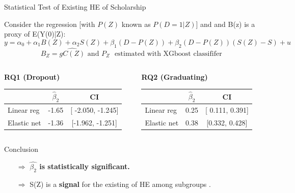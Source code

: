 \documentclass[aspectratio=169]{beamer}
\begin{document}
\begin{frame}{Statistical Test of Existing HE of Scholarship}

Consider the regression [with \( P(Z) \) known as \( P(D = 1 | Z) \)] and and B(z) is a proxy of E(Y(0)|Z):
\[
y = \alpha_0 + \alpha_1 B(Z) + \alpha_2 S(Z) + \beta_1 (D - P(Z)) + \beta_2 (D - P(Z))(S(Z) - S) + u
\]
\[ B_Z = \hat{gC(Z)}  \text{ and }  P_Z  \text{  }   \text{estimated with XGboost classififer }\]

\vspace{10pt}

\begin{columns}
\begin{column}{0.5\textwidth}
\textbf{RQ1 (Dropout)}\\
	\begin{tabular}{l c c}
        \hline
        & \textbf{\(\hat\beta_2\) } & CI \\
        \hline
        Linear reg & -1.65 & [ -2.050, -1.245] \\
        Elastic net & -1.36 & [-1.962, -1.251] \\
        \hline
    \end{tabular} \newline
\end{column}

\begin{column}{0.5\textwidth}
\textbf{RQ2 (Graduating)}\\
	\begin{tabular}{l c c}
        \hline
        & \textbf{ \(\hat\beta_2\)} & CI \\
        \hline
        Linear reg & 0.25 & [ 0.111, 0.391] \\
        Elastic net & 0.38 & [0.332, 0.428] \\
        \hline
    \end{tabular} \newline
\end{column}
\end{columns}

\vspace{10pt}

\begin{exampleblock}{Conclusion}
\vspace{-4pt}
\begin{itemize}
    \item [$\Rightarrow$]
\textbf{ \(\hat{\beta_2}\) is statistically significant.}
\item [$\Rightarrow$] S(Z) is a \textbf{signal} for the existing of  HE among  subgroups .
\end{itemize}
\vspace{-3pt}
	
\end{exampleblock}

\end{frame}
\end{document}
